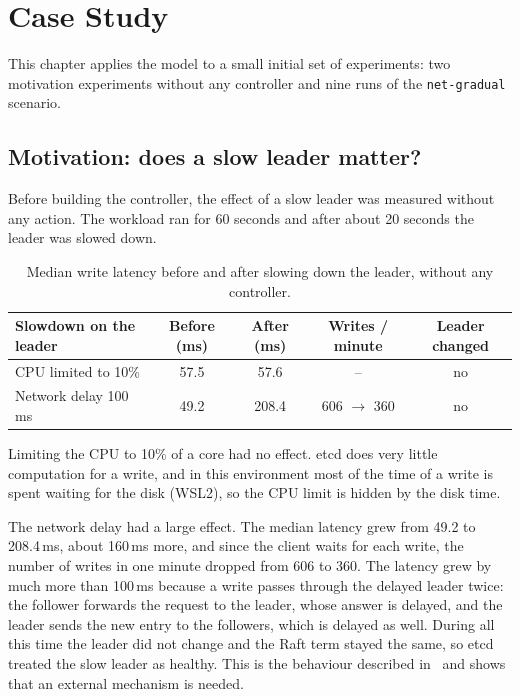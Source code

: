 \documentclass[11pt,a4paper]{article}
\begin{document}
\section{Case Study}

This chapter applies the model to a small initial set of experiments: two motivation experiments without any controller and nine runs of the \texttt{net-gradual} scenario.

\subsection{Motivation: does a slow leader matter?}
\label{sec:motivation}

Before building the controller, the effect of a slow leader was measured without any action. The workload ran for 60 seconds and after about 20 seconds the leader was slowed down.

\begin{table}[H]
\centering
\begin{tabular}{lcccc}
\toprule
Slowdown on the leader & Before (ms) & After (ms) & Writes / minute & Leader changed \\
\midrule
CPU limited to 10\%     & 57.5 & 57.6  & --  & no \\
Network delay 100\,ms   & 49.2 & 208.4 & 606 $\rightarrow$ 360 & no \\
\bottomrule
\end{tabular}
\caption{Median write latency before and after slowing down the leader, without any controller.}
\end{table}

Limiting the CPU to 10\% of a core had no effect. etcd does very little computation for a write, and in this environment most of the time of a write is spent waiting for the disk (WSL2), so the CPU limit is hidden by the disk time.

The network delay had a large effect. The median latency grew from 49.2 to 208.4\,ms, about 160\,ms more, and since the client waits for each write, the number of writes in one minute dropped from 606 to 360. The latency grew by much more than 100\,ms because a write passes through the delayed leader twice: the follower forwards the request to the leader, whose answer is delayed, and the leader sends the new entry to the followers, which is delayed as well. During all this time the leader did not change and the Raft term stayed the same, so etcd treated the slow leader as healthy. This is the behaviour described in~\cite{onesize} and shows that an external mechanism is needed.
\end{document}
